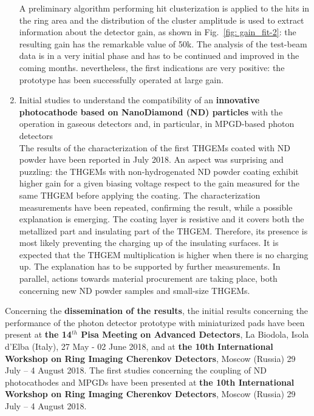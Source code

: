 \begin{enumerate}
     A preliminary algorithm performing hit clusterization is applied to the hits in the ring area and the distribution of the cluster amplitude is used to extract information about the detector gain, as shown in Fig.~\ref{fig: gain_fit-2}: the resulting gain has the remarkable value of 50k. 
     The analysis of the test-beam data is in a very initial phase and has to be continued and improved in the coming months. nevertheless, the first indications are very positive: the prototype has been successfully operated at large gain.
\item
Initial studies to understand the 
compatibility of an \textbf{innovative photocathode 
based on NanoDiamond (ND) particles} with the 
operation in gaseous detectors and, in 
particular, in MPGD-based photon detectors\\
The results of the characterization of the first THGEMs 
coated with ND powder have been reported in July 2018. 
An aspect was surprising and puzzling: the THGEMs with
non-hydrogenated ND powder coating exhibit 
higher gain for a given biasing voltage respect 
to the gain measured for 
the same THGEM before applying the coating.
The characterization measurements have been repeated, confirming 
the result, while a possible explanation is emerging.
The coating layer is resistive and it covers both the 
metallized part and insulating part of the THGEM. 
Therefore, its presence is most likely
preventing the charging up of the insulating surfaces. 
It is expected that the THGEM multiplication is 
higher when there is no charging up. The explanation 
has to be supported by further measurements. 
In parallel, actions towards material procurement 
are taking place, 
both concerning new ND powder samples and small-size THGEMs.
\end{enumerate}
Concerning the \textbf{dissemination of the results}, 
the initial results concerning the performance of the photon
detector prototype with miniaturized pads have been present at 
\textbf{the 
14$^{th}$ Pisa Meeting on Advanced Detectors},
La Biodola, Isola d'Elba (Italy), 27 May - 02 June 2018,
\cite{AGARWALA2018-2} and at \textbf{the 
10th International Workshop on Ring Imaging Cherenkov Detectors}, 
Moscow (Russia) 29 July – 4 August 2018.
The first studies concerning the coupling of ND photocathodes and MPGDs have been presented at \textbf{the 
10th International Workshop on Ring Imaging Cherenkov Detectors}, 
Moscow (Russia) 29 July – 4 August 2018\cite{Agarwala:2018qdm}.
